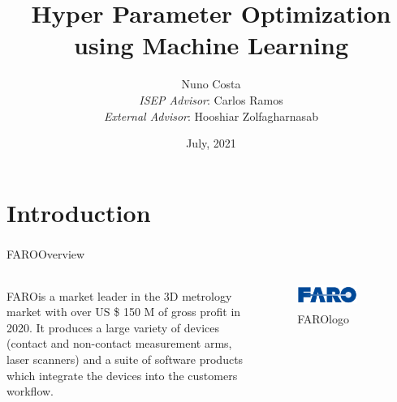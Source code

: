 \documentclass[10pt]{beamer}
\title{Hyper Parameter Optimization \\using Machine Learning}
\date{July, 2021}
\author{{Nuno Costa} \\
{\textit{ISEP Advisor}: Carlos Ramos} \\
{\textit{External Advisor}: Hooshiar Zolfagharnasab}}
\institute{Polytechnic of Porto - School of Engineering (ISEP)}
\newcommand{\faro}[0]{FARO\textsuperscript{\textregistered}\space}
\begin{document}
  \maketitle
  \section{Introduction}
  \begin{frame}{\faro Overview}
    \begin{columns}
      \begin{column}{0.6\textwidth}
        \faro is a market leader in the 3D metrology market with over US \$ 150 M of gross profit in 2020. It produces a large variety of devices (contact and non-contact measurement arms, laser scanners) and a suite of software products which integrate the devices into the customers workflow.
      \end{column}
      \begin{column}{0.5\textwidth}
        \begin{figure}
        \centering
        \includegraphics[width=0.7\textwidth]{images/faro_logo.png}
        \caption{\faro logo}
        \end{figure}
      \end{column}
    \end{columns}
  \end{frame}
\end{document}
